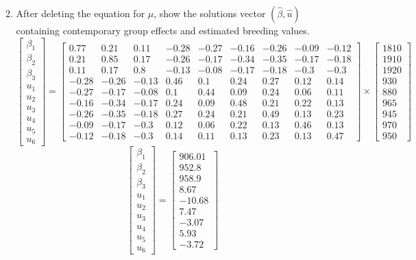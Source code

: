 \documentclass[12pt,a4paper]{paper}
\begin{document}
\begin{enumerate}
\begin{enumerate}
\begin{equation*}
\end{equation*}
\item After deleting the equation for $\mu$, show the solutions vector $(\hat{\beta},\hat{u})$ containing contemporary group effects and estimated breeding values.
\begin{equation*}
\begin{bmatrix}\beta_{1}\\\beta_{2}\\\beta_{3}\\u_{1}\\u_{2}\\u_{3}\\u_{4}\\u_{5}\\u_{6}\end{bmatrix} = \begin{bmatrix}0.77&0.21&0.11&-0.28&-0.27&-0.16&-0.26&-0.09&-0.12\\0.21&0.85&0.17&-0.26&-0.17&-0.34&-0.35&-0.17&-0.18\\0.11&0.17&0.8&-0.13&-0.08&-0.17&-0.18&-0.3&-0.3\\-0.28&-0.26&-0.13&0.46&0.1&0.24&0.27&0.12&0.14\\-0.27&-0.17&-0.08&0.1&0.44&0.09&0.24&0.06&0.11\\-0.16&-0.34&-0.17&0.24&0.09&0.48&0.21&0.22&0.13\\-0.26&-0.35&-0.18&0.27&0.24&0.21&0.49&0.13&0.23\\-0.09&-0.17&-0.3&0.12&0.06&0.22&0.13&0.46&0.13\\-0.12&-0.18&-0.3&0.14&0.11&0.13&0.23&0.13&0.47\end{bmatrix} \times \begin{bmatrix}1810\\1910\\1920\\930\\880\\965\\945\\970\\950\end{bmatrix}
\end{equation*}
\begin{equation*}
\begin{bmatrix}\beta_{1}\\\beta_{2}\\\beta_{3}\\u_{1}\\u_{2}\\u_{3}\\u_{4}\\u_{5}\\u_{6}\end{bmatrix} = \begin{bmatrix}906.01\\952.8\\958.9\\8.67\\-10.68\\7.47\\-3.07\\5.93\\-3.72\end{bmatrix}

\end{equation*}
\end{enumerate}
\end{enumerate}
\end{document}
